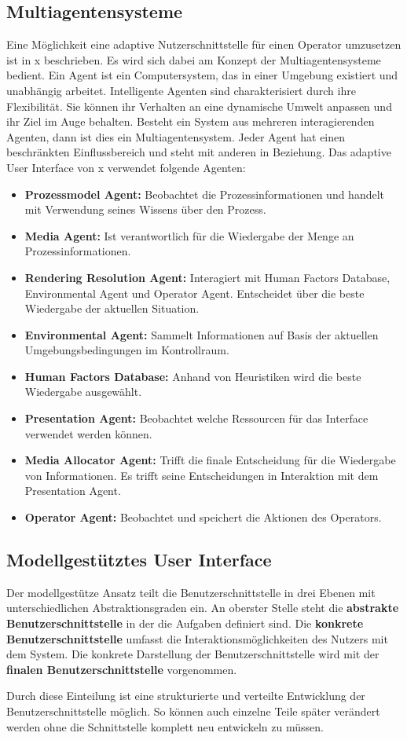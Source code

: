 \subsection{Multiagentensysteme}
Eine Möglichkeit eine adaptive Nutzerschnittstelle für einen Operator umzusetzen ist in x beschrieben. Es wird sich dabei am Konzept der Multiagentensysteme  bedient. Ein Agent ist ein Computersystem, das in einer Umgebung existiert und unabhängig arbeitet. Intelligente Agenten sind charakterisiert durch ihre Flexibilität. Sie können ihr Verhalten an eine dynamische Umwelt anpassen und ihr Ziel im Auge behalten. Besteht ein System aus mehreren interagierenden Agenten, dann ist dies ein Multiagentensystem. Jeder Agent hat einen beschränkten Einflussbereich und steht mit anderen in Beziehung. Das adaptive User Interface von x verwendet folgende Agenten:
\begin{itemize}
\item \textbf{Prozessmodel Agent:} Beobachtet die Prozessinformationen und handelt mit Verwendung seines Wissens über den Prozess.
\item \textbf{Media Agent:} Ist verantwortlich für die Wiedergabe der Menge an Prozessinformationen.
\item \textbf{Rendering Resolution Agent:} Interagiert mit Human Factors Database, Environmental Agent und Operator Agent. Entscheidet über die beste Wiedergabe der aktuellen Situation.
\item \textbf{Environmental Agent:} Sammelt Informationen auf Basis der aktuellen Umgebungsbedingungen im Kontrollraum.
\item \textbf{Human Factors Database:} Anhand von Heuristiken wird die beste Wiedergabe ausgewählt.
\item \textbf{Presentation Agent:} Beobachtet welche Ressourcen für das Interface verwendet werden können.
\item \textbf{Media Allocator Agent:} Trifft die finale Entscheidung für die Wiedergabe von Informationen. Es trifft seine Entscheidungen in Interaktion mit dem Presentation Agent.
\item \textbf{Operator Agent:} Beobachtet und speichert die Aktionen des Operators.
\end{itemize}

\subsection{Modellgestütztes User Interface}
Der modellgestütze Ansatz teilt die Benutzerschnittstelle in drei Ebenen mit unterschiedlichen Abstraktionsgraden ein. An oberster Stelle steht die \textbf{abstrakte Benutzerschnittstelle} in der die Aufgaben definiert sind. Die \textbf{konkrete Benutzerschnittstelle} umfasst die Interaktionsmöglichkeiten des Nutzers mit dem System. Die konkrete Darstellung der Benutzerschnittstelle wird mit der \textbf{finalen Benutzerschnittstelle} vorgenommen.

Durch diese Einteilung ist eine strukturierte und verteilte Entwicklung der Benutzerschnittstelle möglich. So können auch einzelne Teile später verändert werden ohne die Schnittstelle komplett neu entwickeln zu müssen.
